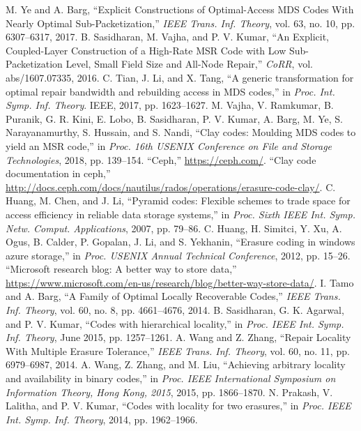 \begin{multicols}{2}
\begin{thebibliography}{99}
 M. Ye and A. Barg, ``Explicit Constructions of Optimal-Access MDS Codes With Nearly Optimal Sub-Packetization,'' \textit{IEEE Trans. Inf. Theory}, vol. 63, no. 10, pp. 6307--6317, 2017.
 B. Sasidharan, M. Vajha, and P. V. Kumar, ``An Explicit, Coupled-Layer Construction of a High-Rate MSR Code with Low Sub-Packetization Level, Small Field Size and All-Node Repair,'' \textit{CoRR}, vol. abs/1607.07335, 2016.
 C. Tian, J. Li, and X. Tang, ``A generic transformation for optimal repair bandwidth and rebuilding access in MDS codes,'' in \textit{Proc. Int. Symp. Inf. Theory}. IEEE, 2017, pp. 1623--1627.
 M. Vajha, V. Ramkumar, B. Puranik, G. R. Kini, E. Lobo, B. Sasidharan, P. V. Kumar, A. Barg, M. Ye, S. Narayanamurthy, S. Hussain, and S. Nandi, ``Clay codes: Moulding MDS codes to yield an MSR code,'' in \textit{Proc. 16th USENIX Conference on File and Storage Technologies}, 2018, pp. 139--154.
 ``Ceph,'' \url{https://ceph.com/}.
 ``Clay code documentation in ceph,'' \url{http://docs.ceph.com/docs/nautilus/rados/operations/erasure-code-clay/}.
 C. Huang, M. Chen, and J. Li, ``Pyramid codes: Flexible schemes to trade space for access efficiency in reliable data storage systems,'' in \textit{Proc. Sixth IEEE Int. Symp. Netw. Comput. Applications}, 2007, pp. 79--86.
 C. Huang, H. Simitci, Y. Xu, A. Ogus, B. Calder, P. Gopalan, J. Li, and S. Yekhanin, ``Erasure coding in windows azure storage,'' in \textit{Proc. USENIX Annual Technical Conference}, 2012, pp. 15--26.
 ``Microsoft research blog: A better way to store data,'' \url{https://www.microsoft.com/en-us/research/blog/better-way-store-data/}.
 I. Tamo and A. Barg, ``A Family of Optimal Locally Recoverable Codes,'' \textit{IEEE Trans. Inf. Theory}, vol. 60, no. 8, pp. 4661--4676, 2014.
 B. Sasidharan, G. K. Agarwal, and P. V. Kumar, ``Codes with hierarchical locality,'' in \textit{Proc. IEEE Int. Symp. Inf. Theory}, June 2015, pp. 1257--1261.
 A. Wang and Z. Zhang, ``Repair Locality With Multiple Erasure Tolerance,'' \textit{IEEE Trans. Inf. Theory}, vol. 60, no. 11, pp. 6979--6987, 2014.
 A. Wang, Z. Zhang, and M. Liu, ``Achieving arbitrary locality and availability in binary codes,'' in \textit{Proc. IEEE International Symposium on Information Theory, Hong Kong, 2015}, 2015, pp. 1866--1870.
 N. Prakash, V. Lalitha, and P. V. Kumar, ``Codes with locality for two erasures,'' in \textit{Proc. IEEE Int. Symp. Inf. Theory}, 2014, pp. 1962--1966.

\end{thebibliography}
\end{multicols}
